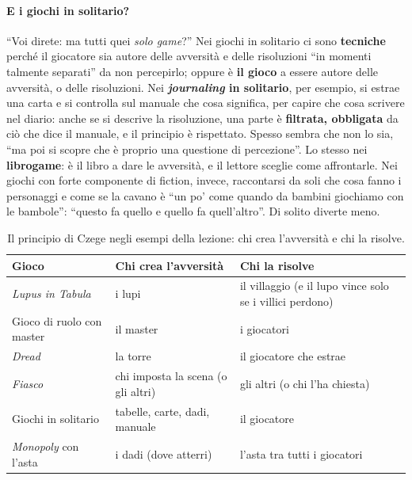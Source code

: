 \paragraph{E i giochi in solitario?} ``Voi direte: ma tutti quei \emph{solo game}?'' Nei giochi in
solitario ci sono \textbf{tecniche} perché il giocatore sia autore delle avversità e delle
risoluzioni ``in momenti talmente separati'' da non percepirlo; oppure è \textbf{il gioco} a essere
autore delle avversità, o delle risoluzioni. Nei \textbf{\emph{journaling} in solitario}, per
esempio, si estrae una carta e si controlla sul manuale che cosa significa, per capire che cosa
scrivere nel diario: anche se si descrive la risoluzione, una parte è \textbf{filtrata,
obbligata} da ciò che dice il manuale, e il principio è rispettato. Spesso sembra che non lo sia,
``ma poi si scopre che è proprio una questione di percezione''. Lo stesso nei
\textbf{librogame}: è il libro a dare le avversità, e il lettore sceglie come affrontarle. Nei
giochi con forte componente di fiction, invece, raccontarsi da soli che cosa fanno i personaggi e
come se la cavano è ``un po' come quando da bambini giochiamo con le bambole'': ``questo fa quello
e quello fa quell'altro''. Di solito diverte meno.

\begin{table}[htbp]
\centering
\small
\caption{Il principio di Czege negli esempi della lezione: chi crea l'avversità e chi la risolve.}
\label{a16:tab:czege}
\begin{tabular}{@{}>{\raggedright\arraybackslash}p{3.4cm}>{\raggedright\arraybackslash}p{4.8cm}>{\raggedright\arraybackslash}p{5.2cm}@{}}
\toprule
\textbf{Gioco} & \textbf{Chi crea l'avversità} & \textbf{Chi la risolve} \\
\midrule
\emph{Lupus in Tabula} & i lupi & il villaggio (e il lupo vince solo se i villici perdono) \\
Gioco di ruolo con master & il master & i giocatori \\
\emph{Dread} & la torre & il giocatore che estrae \\
\emph{Fiasco} & chi imposta la scena (o gli altri) & gli altri (o chi l'ha chiesta) \\
Giochi in solitario & tabelle, carte, dadi, manuale & il giocatore \\
\emph{Monopoly} con l'asta & i dadi (dove atterri) & l'asta tra tutti i giocatori \\
\bottomrule
\end{tabular}
\end{table}

